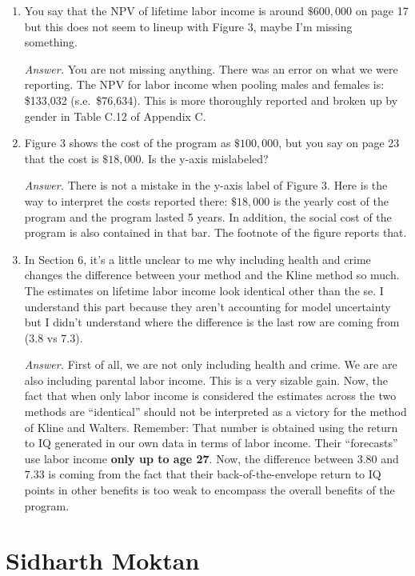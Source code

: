 \begin{enumerate}
\item You say that the NPV of lifetime labor income is around $\$600,000$ on page 17 but this does not seem to lineup with Figure 3, maybe I'm missing something.

\noindent \textit{Answer.} You are not missing anything. There was an error on what we were reporting. The NPV for labor income when pooling males and females is: \$133,032 (s.e.\ \$76,634). This is more thoroughly reported and broken up by gender in Table C.12 of Appendix C.

\item Figure 3 shows the cost of the program as $\$100,000$, but you say on page 23 that the cost is $\$18,000$. Is the y-axis mislabeled?

\noindent \textit{Answer.} There is not a mistake in the y-axis label of Figure 3. Here is the way to interpret the costs reported there: $\$18,000$ is the yearly cost of the program and the program lasted 5 years. In addition, the social cost of the program is also contained in that bar. The footnote of the figure reports that.

\item In Section 6, it's a little unclear to me why including health and crime changes the difference between your method and the Kline method so much.  The estimates on lifetime labor income look identical other than the se.  I understand this part because they aren't accounting for model uncertainty but I didn't understand where the difference is the last row are coming from (3.8 vs 7.3).

\noindent \textit{Answer.} First of all, we are not only including health and crime. We are are also including parental labor income. This is a very sizable gain. Now, the fact that when only labor income is considered the estimates across the two methods are ``identical'' should not be interpreted as a victory for the method of Kline and Walters. Remember: That number is obtained using the return to IQ generated in our own data in terms of labor income. Their ``forecasts'' use labor income \textbf{only up to age 27}. Now, the difference between $3.80$ and $7.33$ is coming from the fact that their back-of-the-envelope return to IQ points in other benefits is too weak to encompass the overall benefits of the program.
\end{enumerate}

\section*{Sidharth Moktan}

